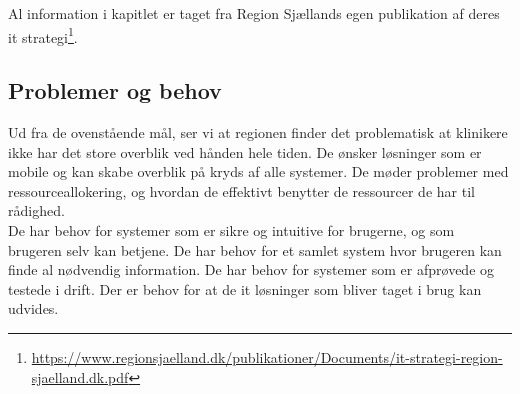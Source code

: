 Al information i kapitlet er taget fra Region Sjællands egen publikation af deres it strategi\footnote{\url{https://www.regionsjaelland.dk/publikationer/Documents/it-strategi-region-sjaelland.dk.pdf}}.

\subsection{Problemer og behov}
Ud fra de ovenstående mål, ser vi at regionen finder det problematisk at klinikere ikke har det store overblik ved hånden hele tiden. De ønsker løsninger som er mobile og kan skabe overblik på kryds af alle systemer. De møder problemer med ressourceallokering, og hvordan de effektivt benytter de ressourcer de har til rådighed.\\
De har behov for systemer som er sikre og intuitive for brugerne, og som brugeren selv kan betjene. De har behov for et samlet system hvor brugeren kan finde al nødvendig information. De har behov for systemer som er afprøvede og testede i drift. Der er behov for at de it løsninger som bliver taget i brug kan udvides.